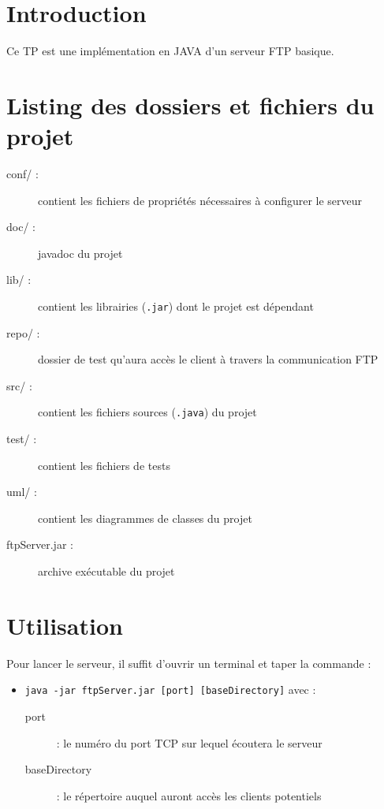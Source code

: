 \section*{Introduction}
Ce TP est une implémentation en JAVA d'un serveur FTP basique.

\section*{Listing des dossiers et fichiers du projet}
\begin{description}
	\item[conf/ :] contient les fichiers de propriétés nécessaires à configurer le serveur
	\item[doc/ :] javadoc du projet
	\item[lib/ :] contient les librairies (\verb+.jar+) dont le projet est dépendant
	\item[repo/ :] dossier de test qu'aura accès le client à travers la communication FTP
	\item[src/ :] contient les fichiers sources (\verb+.java+) du projet
	\item[test/ :] contient les fichiers de tests
	\item[uml/ :] contient les diagrammes de classes du projet
	\item[ftpServer.jar :] archive exécutable du projet
\end{description}

\section*{Utilisation}
Pour lancer le serveur, il suffit d'ouvrir un terminal et taper la commande :
\begin{itemize}
	\item \verb+java -jar ftpServer.jar [port] [baseDirectory]+ avec :
		\begin{description}
			\item[port] : le numéro du port TCP sur lequel écoutera le serveur
			\item[baseDirectory] : le répertoire auquel auront accès les clients potentiels
		\end{description}
\end{itemize}

